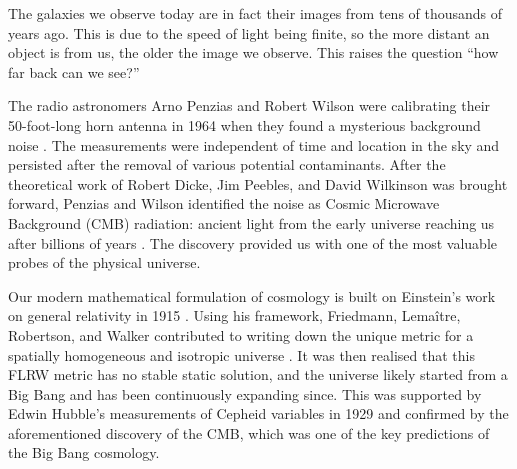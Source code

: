 %
%
%
%
%
%
%
%
%
%
%
%

The galaxies we observe today are in fact their images from tens of thousands of years ago. This is due to the speed of light being finite, so the more distant an object is from us, the older the image we observe. This raises the question ``how far back can we see?''

The radio astronomers Arno Penzias and Robert Wilson were calibrating their 50-foot-long horn antenna in 1964 when they found a mysterious background noise \cite{Penzias1965}. The measurements were independent of time and location in the sky and persisted after the removal of various potential contaminants. After the theoretical work of Robert Dicke, Jim Peebles, and David Wilkinson was brought forward, Penzias and Wilson identified the noise as Cosmic Microwave Background (CMB) radiation: ancient light from the early universe reaching us after billions of years \cite{Penzias1965,Dicke1965}. The discovery provided us with one of the most valuable probes of the physical universe. %

Our modern mathematical formulation of cosmology is built on Einstein's work on general relativity in 1915 \cite{Einstein1915fieldequations}. Using his framework, Friedmann, Lemaître, Robertson, and Walker contributed to writing down the unique metric for a spatially homogeneous and isotropic universe \cite{Friedman1922flrw1,Friedmann1924flrw2,Lemaitre1927flrw,Robertson1935flrw,Walker1937flrw}.  It was then realised that this FLRW metric has no stable static solution, and the universe likely started from a Big Bang and has been continuously expanding since. This was supported by Edwin Hubble's measurements of Cepheid variables in 1929 \cite{Hubble1929} and confirmed by the aforementioned discovery of the CMB, which was one of the key predictions of the Big Bang cosmology.

